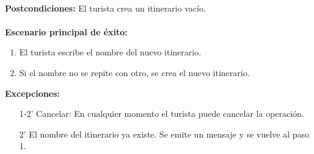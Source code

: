 \documentclass[11pt]{article}
\begin{document}
\\
\textbf{Postcondiciones:} El turista crea un itinerario vacío.\\
\\
\textbf{Escenario principal de éxito:}
\\
\begin{enumerate}
\item El turista escribe el nombre del nuevo itinerario.
\item Si el nombre no se repite con otro, se crea el nuevo itinerario.
\end{enumerate}
\textbf{Excepciones:}
\begin{enumerate}
\item[1-2'] Cancelar: En cualquier momento el turista puede cancelar la operación.
\item[2'] El nombre del itinerario ya existe. Se emite un mensaje y se vuelve al paso 1.
\end{enumerate}
\end{document}
